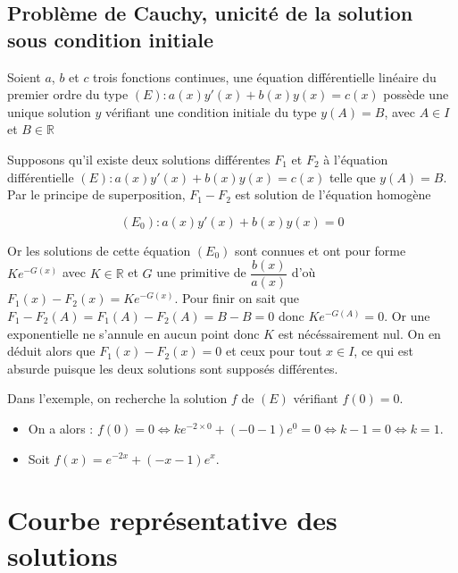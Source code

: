\documentclass[french]{book}
\begin{document}
\subsection{Problème de Cauchy, unicité de la solution sous condition initiale}

\begin{thm}
Soient $a$, $b$ et $c$ trois fonctions continues, une équation différentielle linéaire du premier ordre du type $(E):a(x)y'(x)+b(x)y(x) =c(x)$ possède une unique solution $y$ vérifiant une condition initiale du type $y(A)=B$, avec $A \in I$ et $B\in \mathbb{R}$
\end{thm}

\begin{demo}[De l'unicité]
Supposons qu'il existe deux solutions différentes $F_1$ et $F_2$ à l'équation différentielle $(E):a(x)y'(x)+b(x)y(x) =c(x)$ telle que  $y(A)=B$.\\

Par le principe de superposition, $F_1-F_2$ est solution de l'équation homogène 

$$(E_0): a(x)y'(x)+b(x)y(x) =0 $$ 

Or les solutions de cette équation $ (E_0)$ sont connues et ont pour forme $Ke^{-G(x)}$ avec $K \in \mathbb{R}$ et $G$ une primitive de $\dfrac{b(x)}{a(x)}$  d'où $F_1(x) -F_2(x) = Ke^{-G(x)}$.
Pour finir on sait que $F_1-F_2(A)=F_1(A)-F_2(A) = B-B=0$ donc $Ke^{-G(A)}=0$. Or une exponentielle ne s'annule en aucun point donc $K$ est nécéssairement nul.
On en déduit alors que $F_1(x) -F_2(x) = 0$ et ceux pour tout $x \in I$, ce qui est absurde puisque les deux solutions sont supposés différentes.

\end{demo}

\begin{exemple}
Dans l'exemple, on recherche la solution $f$ de $(E)$ vérifiant $f(0)=0$. \\
\begin{itemize}
   \item On a alors : $f(0)=0 \Longleftrightarrow ke^{-2\times0}+(-0-1)e^0=0 \Longleftrightarrow k-1=0 \Longleftrightarrow k=1$.
   \item Soit $f(x)=e^{-2x}+(-x-1)e^x$.
\end{itemize}
\end{exemple}

\newpage
\section{Courbe représentative des solutions}
\end{document}
